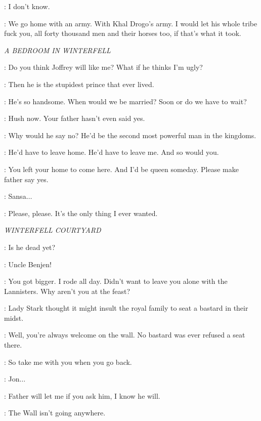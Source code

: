 \DAENERYS: I don't know. 

\VISERYS: We go home with an army. With Khal Drogo's army. I would let his whole tribe fuck you, all forty thousand men and their horses too, if that's what it took. 


\scene

\textit{A BEDROOM IN WINTERFELL} 


\SANSA: Do you think Joffrey will like me? What if he thinks I'm ugly? 

\CATELYN: Then he is the stupidest prince that ever lived. 

\SANSA: He's so handsome. When would we be married? Soon or do we have to wait? 

\CATELYN: Hush now. Your father hasn't even said yes. 

\SANSA: Why would he say no? He'd be the second most powerful man in the kingdoms. 

\CATELYN: He'd have to leave home. He'd have to leave me. And so would you. 

\SANSA: You left your home to come here. And I'd be queen someday. Please make father say yes. 

\CATELYN: Sansa$\ldots$ 

\SANSA: Please, please. It's the only thing I ever wanted. 


\scene

\textit{WINTERFELL COURTYARD} 


\BENJEN: Is he dead yet? 

\JON: Uncle Benjen! 


\BENJEN: You got bigger. I rode all day. Didn't want to leave you alone with the Lannisters. Why aren't you at the feast? 

\JON: Lady Stark thought it might insult the royal family to seat a bastard in their midst. 

\BENJEN: Well, you're always welcome on the wall. No bastard was ever refused a seat there. 

\JON: So take me with you when you go back. 

\BENJEN: Jon$\ldots$ 

\JON: Father will let me if you ask him, I know he will. 

\BENJEN: The Wall isn't going anywhere. 

